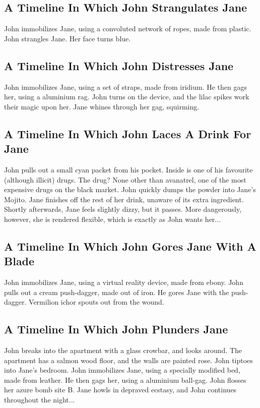 \documentclass{article}
\begin{document}
\subsection{A Timeline In Which John Strangulates Jane}


John immobilizes Jane, using a convoluted network of ropes, made from plastic.
John strangles Jane.
Her face turns blue.
\subsection{A Timeline In Which John Distresses Jane}


John immobilizes Jane, using a set of straps, made from iridium.
He then gags her, using a aluminium rag.
John turns on the device, and the lilac spikes work their magic upon her.
Jane whines through her gag, squirming.
\subsection{A Timeline In Which John Laces A Drink For Jane}


John pulls out a small cyan packet from his pocket. Inside is one of his favourite (although illicit) drugs.
The drug? None other than avanatrel, one of the most expensive drugs on the black market.
John quickly dumps the powder into Jane's Mojito.
Jane finishes off the rest of her drink, unaware of its extra ingredient.
Shortly afterwards, Jane feels slightly dizzy, but it passes.
More dangerously, however, she is rendered flexible, which is exactly as John wants her...
\subsection{A Timeline In Which John Gores Jane With A Blade}


John immobilizes Jane, using a virtual reality device, made from ebony.
John pulls out a cream push{-}dagger, made out of iron.
He gores Jane with the push{-}dagger.
Vermilion ichor spouts out from the wound.
\subsection{A Timeline In Which John Plunders Jane}


John breaks into the apartment with a glass crowbar, and looks around.
The apartment has a salmon wood floor, and the walls are painted rose.
John tiptoes into Jane's bedroom.
John immobilizes Jane, using a specially modified bed, made from leather.
He then gags her, using a aluminium ball{-}gag.
John flosses her azure bomb site B.
Jane howls in depraved ecstasy, and John continues throughout the night...
\end{document}
